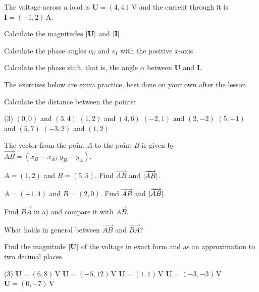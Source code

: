 The voltage across a load is $\mathbf{U} = (4, 4)\,\text{V}$ and the current through it is
$\mathbf{I} = (-1, 2)\,\text{A}$.
\begin{parts}
  \item Calculate the magnitudes $\lvert\mathbf{U}\rvert$ and $\lvert\mathbf{I}\rvert$.
  \item Calculate the phase angles $v_U$ and $v_I$ with the positive $x$-axis.
  \item Calculate the phase shift, that is, the angle $\alpha$ between $\mathbf{U}$ and $\mathbf{I}$.
\end{parts}

The exercises below are extra practice, best done on your own after the lesson.

Calculate the distance between the points:
\begin{delar}(3)
  \task $(0, 0)$ and $(3, 4)$
  \task $(1, 2)$ and $(4, 6)$
  \task $(-2, 1)$ and $(2, -2)$
  \task $(5, -1)$ and $(5, 7)$
  \task $(-3, 2)$ and $(1, 2)$
\end{delar}

The vector from the point $A$ to the point $B$ is given by $\overrightarrow{AB} = (x_B - x_A;\,
y_B - y_A)$.
\begin{parts}
  \item $A = (1, 2)$ and $B = (5, 5)$. Find $\overrightarrow{AB}$ and $\lvert\overrightarrow{AB}\rvert$.
  \item $A = (-1, 4)$ and $B = (2, 0)$. Find $\overrightarrow{AB}$ and $\lvert\overrightarrow{AB}\rvert$.
  \item Find $\overrightarrow{BA}$ in a) and compare it with $\overrightarrow{AB}$.
  \item What holds in general between $\overrightarrow{AB}$ and $\overrightarrow{BA}$?
\end{parts}

Find the magnitude $\lvert\mathbf{U}\rvert$ of the voltage in exact form and as an approximation to two
decimal places.
\begin{delar}(3)
  \task $\mathbf{U} = (6, 8)\,\text{V}$
  \task $\mathbf{U} = (-5, 12)\,\text{V}$
  \task $\mathbf{U} = (1, 1)\,\text{V}$
  \task $\mathbf{U} = (-3, -3)\,\text{V}$
  \task $\mathbf{U} = (0, -7)\,\text{V}$
\end{delar}

